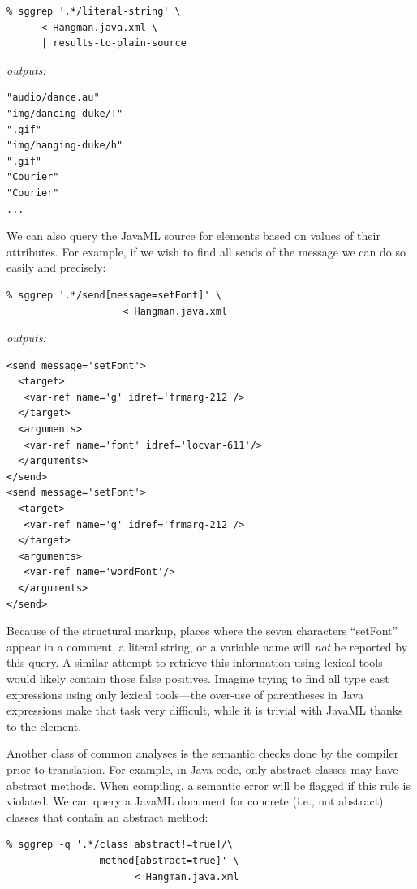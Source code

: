 \documentclass{article}
\begin{document}
\begin{multicols}{2}
\begin{verbatim}
% sggrep '.*/literal-string' \
      < Hangman.java.xml \
      | results-to-plain-source
\end{verbatim}

\noindent\emph{outputs:}
\begin{verbatim}
"audio/dance.au"
"img/dancing-duke/T"
".gif"
"img/hanging-duke/h"
".gif"
"Courier"
"Courier"
...
\end{verbatim}

We can also query the JavaML source for elements based on values of
their attributes.  For example, if we wish to find all sends of the
message \smtexttt{setFont} we can do so easily and precisely:

\begin{verbatim}
% sggrep '.*/send[message=setFont]' \
                    < Hangman.java.xml 
\end{verbatim}

\noindent\emph{outputs:}
{\small
\begin{verbatim}
<send message='setFont'>
  <target>
   <var-ref name='g' idref='frmarg-212'/>
  </target>
  <arguments>
   <var-ref name='font' idref='locvar-611'/>
  </arguments>
</send>
<send message='setFont'>
  <target>
   <var-ref name='g' idref='frmarg-212'/>
  </target>
  <arguments>
   <var-ref name='wordFont'/>
  </arguments>
</send>
\end{verbatim}
}

\noindent Because of the structural markup, places where the seven characters
``setFont'' appear in a comment, a literal string, or a variable name
will \emph{not} be reported by this query.  A similar attempt to
retrieve this information using lexical tools would likely contain those
false positives.  Imagine trying to find all type cast expressions using 
only lexical tools---the over-use of parentheses in Java expressions
make that task very difficult, while it is trivial with JavaML thanks to 
the \smtexttt{cast-expr} element.

Another class of common analyses is the semantic checks done by the
compiler prior to translation.  For example, in Java code, only abstract
classes may have abstract methods.  When compiling, a semantic error
will be flagged if this rule is violated.  We can query a JavaML document
for concrete (i.e., not abstract) classes that contain an abstract method:

{\small
\begin{verbatim}
% sggrep -q '.*/class[abstract!=true]/\
                method[abstract=true]' \
                      < Hangman.java.xml
\end{verbatim}
}


\end{multicols}
\end{document}
